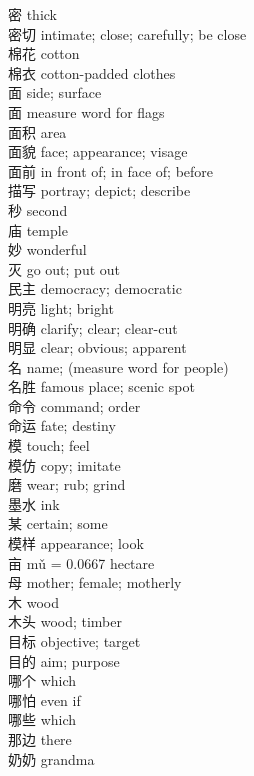 密 \quad thick\\
密切 \quad intimate; close; carefully; be close\\
棉花 \quad cotton\\
棉衣 \quad cotton-padded clothes\\
面 \quad side; surface\\
面 \quad measure word for flags\\
面积 \quad area\\
面貌 \quad face; appearance; visage\\
面前 \quad in front of; in face of; before\\
描写 \quad portray; depict; describe\\
秒 \quad second\\
庙 \quad temple\\
妙 \quad wonderful\\
灭 \quad go out; put out\\
民主 \quad democracy; democratic\\
明亮 \quad light; bright\\
明确 \quad clarify; clear; clear-cut\\
明显 \quad clear; obvious; apparent\\
名 \quad name; (measure word for people)\\
名胜 \quad famous place; scenic spot\\
命令 \quad command; order\\
命运 \quad fate; destiny\\
模 \quad touch; feel\\
模仿 \quad copy; imitate\\
磨 \quad wear; rub; grind\\
墨水 \quad ink\\
某 \quad certain; some\\
模样 \quad appearance; look\\
亩  mǔ = 0.0667 hectare\\
母 \quad mother; female; motherly\\
木 \quad wood\\
木头 \quad wood; timber\\
目标 \quad objective; target\\
目的 \quad aim; purpose\\
哪个 \quad which\\
哪怕 \quad even if\\
哪些 \quad which\\
那边 \quad there\\
奶奶 \quad grandma\\
